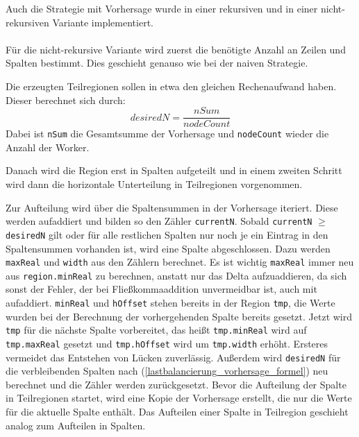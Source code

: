 Auch die Strategie mit Vorhersage wurde in einer rekursiven und in einer nicht-rekursiven Variante implementiert.

\paragraph*{} \label{lastbalancierung_vorhersage}
Für die nicht-rekursive Variante wird zuerst die benötigte Anzahl an Zeilen und Spalten bestimmt.
Dies geschieht genauso wie bei der naiven Strategie.

Die erzeugten Teilregionen sollen in etwa den gleichen Rechenaufwand haben. Dieser berechnet sich durch:
\begin{equation} \label{lastbalancierung_vorhersage_formel}
	desiredN = \frac{nSum}{nodeCount}
\end{equation}
Dabei ist \verb|nSum| die Gesamtsumme der Vorhersage und \verb|nodeCount| wieder die Anzahl der Worker.

Danach wird die Region erst in Spalten aufgeteilt und in einem zweiten Schritt wird dann die horizontale Unterteilung in Teilregionen vorgenommen.

Zur Aufteilung wird über die Spaltensummen in der Vorhersage iteriert. Diese werden aufaddiert und bilden so den Zähler \verb|currentN|.
Sobald \verb|currentN| $\geq$ \verb|desiredN| gilt oder für alle restlichen Spalten nur noch je ein Eintrag in den Spaltensummen vorhanden ist, wird eine Spalte abgeschlossen.
Dazu werden \verb|maxReal| und \verb|width| aus den Zählern berechnet. Es ist wichtig \verb|maxReal| immer neu aus \verb|region.minReal| zu berechnen, anstatt nur das Delta aufzuaddieren, da sich sonst der Fehler, der bei Fließkommaaddition unvermeidbar ist, auch mit aufaddiert. \verb|minReal| und \verb|hOffset| stehen bereits in der Region \verb|tmp|, die Werte wurden bei der Berechnung der vorhergehenden Spalte bereits gesetzt.
Jetzt wird \verb|tmp| für die nächste Spalte vorbereitet, das heißt \verb|tmp.minReal| wird auf \verb|tmp.maxReal| gesetzt und \verb|tmp.hOffset| wird um \verb|tmp.width| erhöht. Ersteres vermeidet das Entstehen von Lücken zuverlässig.
Außerdem wird \verb|desiredN| für die verbleibenden Spalten nach (\ref{lastbalancierung_vorhersage_formel}) neu berechnet und die Zähler werden zurückgesetzt.
Bevor die Aufteilung der Spalte in Teilregionen startet, wird eine Kopie der Vorhersage erstellt, die nur die Werte für die aktuelle Spalte enthält.
Das Aufteilen einer Spalte in Teilregion geschieht analog zum Aufteilen in Spalten.


